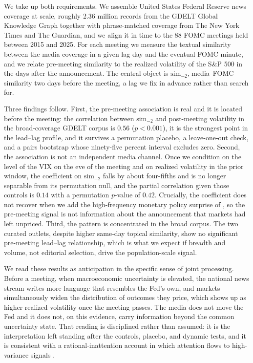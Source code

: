 \documentclass[11pt,a4paper]{article}
\newcommand{\simk}[1]{\ensuremath{\mathrm{sim}_{#1}}}
\begin{document}
We take up both requirements. We assemble United States Federal Reserve news
coverage at scale, roughly 2.36 million records from the GDELT Global Knowledge
Graph together with phrase-matched coverage from The New York Times and The
Guardian, and we align it in time to the 88 FOMC meetings held between 2015 and
2025. For each meeting we measure the textual similarity between the media
coverage in a given lag day and the eventual FOMC minute, and we relate
pre-meeting similarity to the realized volatility of the S\&P 500 in the days
after the announcement. The central object is \simk{-2}, media--FOMC similarity two
days before the meeting, a lag we fix in advance rather than search for.

Three findings follow. First, the pre-meeting association is real and it is
located before the meeting: the correlation between \simk{-2} and post-meeting
volatility in the broad-coverage GDELT corpus is $0.56$ ($p<0.001$), it is the
strongest point in the lead--lag profile, and it survives a permutation placebo, a
leave-one-out check, and a pairs bootstrap whose ninety-five percent interval
excludes zero. Second, the association is not an independent media channel. Once we
condition on the level of the VIX on the eve of the meeting and on realized
volatility in the prior window, the coefficient on \simk{-2} falls by about
four-fifths and is no longer separable from its permutation null, and the partial
correlation given those controls is $0.14$ with a permutation $p$-value of $0.42$.
Crucially, the coefficient does not recover when we add the high-frequency monetary
policy surprise of \citet{bauer2023reassessment}, so the pre-meeting signal is not
information about the announcement that markets had left unpriced.
Third, the pattern is concentrated in the broad corpus. The two curated outlets,
despite higher same-day topical similarity, show no significant pre-meeting
lead--lag relationship, which is what we expect if breadth and volume, not
editorial selection, drive the population-scale signal.

We read these results as anticipation in the specific sense of joint processing.
Before a meeting, when macroeconomic uncertainty is elevated, the national news
stream writes more language that resembles the Fed's own, and markets
simultaneously widen the distribution of outcomes they price, which shows up as
higher realized volatility once the meeting passes. The media does not move the
Fed and it does not, on this evidence, carry information beyond the common
uncertainty state. That reading is disciplined rather than assumed: it is the
interpretation left standing after the controls, placebo, and dynamic tests, and
it is consistent with a rational-inattention account in which attention flows to
high-variance signals \citep{sims2003implications,mackowiak2009optimal}.
\end{document}
